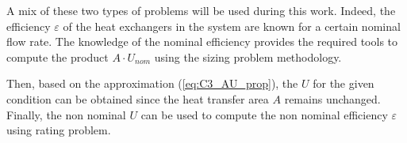 A mix of these two types of problems will be used during this work. Indeed, the efficiency $\varepsilon$ of the heat exchangers in the system are known for a certain nominal flow rate.    The knowledge of the nominal efficiency provides the required tools to compute the product $A\cdot U_{nom}$ using the sizing problem methodology. 

Then, based on the approximation (\ref{eq:C3_AU_prop}), the $U$ for the given condition can be obtained since the heat transfer area $A$ remains unchanged. Finally, the non nominal $U$ can be used to compute the non nominal efficiency $\varepsilon$ using rating problem.